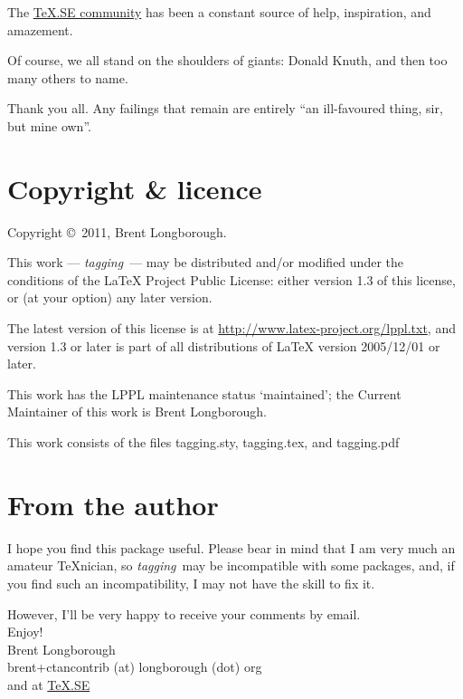 \documentclass[a4paper,12pt,twoside,openany]{memoir}
\newcommand{\tpname}{\textsf{\itshape tagging}}
\begin{document}
The \href{http://tex.stackexchange.com}{\TeX.SE community}
has been a constant source of help, inspiration, and amazement.

Of course, we all stand on the shoulders of giants: Donald Knuth,
and then too many others to name.

Thank you all. Any failings that remain are entirely
``an ill-favoured thing, sir, but mine own''.

\section{Copyright \& licence}
Copyright \copyright\ 2011, Brent Longborough.

This work --- \tpname\ --- may be distributed and/or modified under the
conditions of the LaTeX Project Public License: either version 1.3
of this license, or (at your option) any later version.

The latest version of this license is at
\url{http://www.latex-project.org/lppl.txt},
and version 1.3 or later is part of all distributions of \LaTeX
version 2005/12/01 or later.

This work has the LPPL maintenance status `maintained';
the Current Maintainer of this work is Brent Longborough.

This work consists of the files 
tagging.sty, tagging.tex, and tagging.pdf

\section{From the author}
I hope you find this package useful.
Please bear in mind that I am very much an amateur \TeX nician,
so \tpname\ may be incompatible with some packages, and,
if you find such an incompatibility, I may not have the skill to fix it.

However, I'll be very happy to receive your comments by email.\\[\baselineskip]
Enjoy!\\
Brent Longborough\\[\baselineskip]
\textsf{brent+ctancontrib (at) longborough (dot) org}\\
and at \href{http://tex.stackexchange.com/users/344/brent-longborough}{\TeX.SE}
\end{document}
